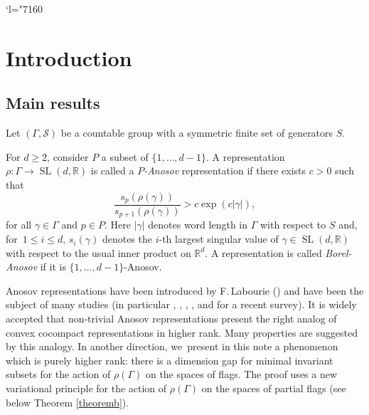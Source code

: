 \documentclass[JEP,XML,SOM,Unicode,NoEqCountersInSection,published]{cedram}
\newcommand{\Changel}{\mathcode`l="7160}
\newcommand{\R}{\mathbb{R}}
\newcommand{\cS}{\mathcal{S}}
\let\G\Gamma
\let\g\gamma
\DeclareMathOperator{\SL}{SL}
\begin{document}
\Changel

\section{Introduction}

\subsection{Main results}

Let \((\Gamma,\cS)\) be a countable group with a symmetric finite set of generators \(S\).

For \(d \ge 2\), consider \(P\) a subset of \(\lbrace 1,\ldots, d-1\rbrace\).
A representation \(\rho: \Gamma \to \SL(d,\R)\)
is called a {\it{\(P\)-Anosov}} representation if there exists \(c > 0\) such that
\[
\frac{s_{p}(\rho(\gamma))}{s_{p+1}(\rho(\gamma))} > c\exp(c|\gamma|),
\]
for all \(\gamma \in \Gamma\) and \(p \in P\). Here \(|\gamma|\) denotes word length in \(\Gamma\) with respect to \(S\) and, for~\(1\le i\le d, \, s_i(\g)\) denotes the \(i\)-th largest singular value of \(\g \in \SL(d,\R)\) with respect to the usual inner product on \(\R^d\). A representation is called {\it{Borel-Anosov}} if it is \(\lbrace 1,\ldots, d-1\rbrace\)-Anosov.

Anosov representations have been introduced by F.\,Labourie (\cite{Lab06}) and have been the subject of many studies (\cf in particular \cite{GGKW17}, \cite {KLP16}, \cite{KLP17}, \cite{KLP18a}, \cite{BPS19} and \cite{canary} for a recent survey). It is widely accepted that non-trivial Anosov representations present the right analog of convex cocompact representations in higher rank. Many properties are suggested by this analogy. In another direction, we~present in this note a phenomenon which is purely higher rank: there is a dimension gap for minimal invariant subsets for the action of \(\rho (\G) \) on the spaces of flags. The proof uses a new variational principle for the action of \(\rho (\G) \) on the spaces of partial flags (see below Theorem \ref{theoremb}).
\end{document}

